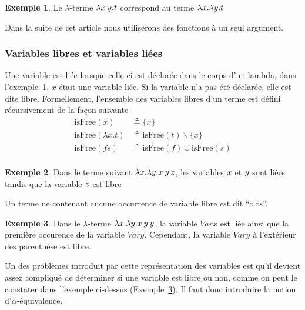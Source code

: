 \documentclass {article}
\theoremstyle{definition}
\newtheorem{example}{Exemple}
\theoremstyle{remark}
\begin{document}
\begin{example}
  \label{example:id}
  Le \(\lambda\)-terme $\lambda x\: y. t$ correspond au terme $\lambda x. \lambda y. t$  
\end{example} 

Dans la suite de cet article nous utiliserons des fonctions à un seul
argument.

\subsubsection{Variables libres et variables liées}

\newcommand{\IsFree}{\mathrm{isFree}}

Une variable est liée lorsque celle ci est déclarée dans le corps d'un
lambda, dans l'exemple~\ref{example:id}, $x$ était une variable liée.
Si la variable n'a pas été déclarée, elle est dite
libre. Formellement, l'ensemble des variables libres d'un terme est
défini récursivement de la façon suivante
%
\begin{align*}
  \IsFree(x) &\triangleq \{x\} \\
  \IsFree(\lambda x. t) &\triangleq \IsFree(t) \backslash \{x\} \\
  \IsFree(f s) &\triangleq \IsFree(f) \cup \IsFree(s) \\
\end{align*}


\begin{example}
  Dans le terme suivant \(\lambda x. \lambda y. x\:y\:z\), 
  les variables $x$ et $y$ sont liées tandis que la variable $z$ est libre 
\end{example}


Un terme ne contenant aucune occurrence de variable libre est dit ``clos''.

\begin{example}  
  \label{example:ouvert-clos}  
  Dans le $\lambda$-terme \(\lambda x. \lambda y. x\:y\:y\), la
  variable $Var{x}$ est liée ainsi que la première occurence de la
  variable $Var{y}$. Cependant, la variable $Var{y}$ à l'extérieur des
  parenthèse est libre.
\end{example}

\label{problemelibreliee}
Un des problèmes introduit par cette représentation des variables est qu'il devient assez compliqué de déterminer si une variable est libre ou non, comme on peut le constater dans l'exemple ci-dessus (Exemple~\ref{example:ouvert-clos}). Il faut donc introduire la notion 
d'$\alpha$-équivalence.
\end{document}
